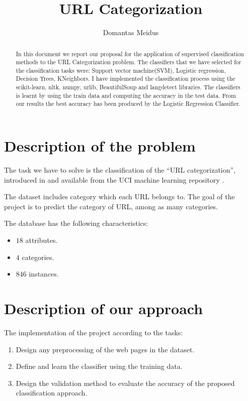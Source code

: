 \documentclass{article} %
\title{URL Categorization}
\author{Domantas Meidus}
\begin{document}
\maketitle



\begin{abstract}
  In this document we report our proposal for the application of supervised classification methods to the URL Categorization problem. The classifiers that we have selected for the classification tasks were: Support vector machine(SVM), Logistic regression, Decision Trees, KNeighbors. I have implemented the classification process using the scikit-learn, nltk, numpy, urlib, BeautifulSoup and langdetect libraries. The classifiers is learnt by using the train data and computing the accuracy in the test data. From our results the best accuracy has been produced by the Logistic Regression Classifier.
\end{abstract}

\section{Description of the problem}
 
 The task we have to solve is the classification of the  ``URL categorization'', introduced in \cite{Siebert:1987} and available from the UCI machine learning repository \cite{Blake_and_Merz:1998}. 
 
 The dataset includes category which each URL belongs to. The goal of the project is to predict the category of URL, among as many categories.

  The database has the following characteristics: 

\begin{itemize}
  \item $18$ attributes.
  \item $4$ categories.
  \item $846$ instances. 
\end{itemize}


\section{Description of our approach}
  
 The implementation of the project according to the tasks:

\begin{enumerate} 

 \item Design any preprocessing of the web pages in the dataset.

 \item Define and learn the classifier using the training data.

 \item  Design the validation method to evaluate the accuracy of the proposed classification approach.
 
\end{enumerate} 
\end{document}
